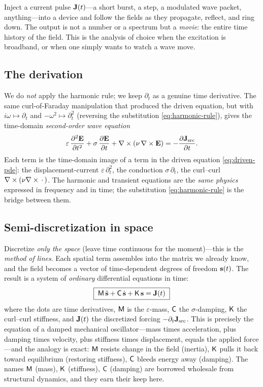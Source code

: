 \begin{physicsbox}
Inject a current pulse $\mathbf{J}(t)$---a short burst, a step, a modulated wave packet,
anything---into a device and follow the fields as they propagate, reflect, and
ring down. The output is not a number or a spectrum but a \emph{movie}: the
entire time history of the field. This is the analysis of choice when the
excitation is broadband, or when one simply wants to watch a wave move.
\end{physicsbox}

\subsection{The derivation}

We do \emph{not} apply the harmonic rule; we keep $\partial_t$ as a genuine time
derivative. The same curl-of-Faraday manipulation that produced the driven
equation, but with $i\omega\mapsto\partial_t$ and $-\omega^2\mapsto\partial_t^2$
(reversing the substitution \cref{eq:harmonic-rule}), gives the time-domain
\emph{second-order wave equation}
\begin{equation}
  \varepsilon\,\frac{\partial^2\mathbf{E}}{\partial t^2}
    + \sigma\,\frac{\partial\mathbf{E}}{\partial t}
    + \nabla\times(\nu\,\nabla\times\mathbf{E})
    = -\frac{\partial\mathbf{J}_{\text{src}}}{\partial t}.
  \label{eq:transient-pde}
\end{equation}
Each term is the time-domain image of a term in the driven equation
\cref{eq:driven-pde}: the displacement-current $\varepsilon\,\partial_t^2$, the
conduction $\sigma\,\partial_t$, the curl--curl $\nabla\times(\nu\nabla\times\,\cdot\,)$. The
harmonic and transient equations are the \emph{same physics} expressed in
frequency and in time; the substitution \cref{eq:harmonic-rule} is the bridge
between them.

\subsection{Semi-discretization in space}

Discretize \emph{only the space} (leave time continuous for the moment)---this is
the \emph{method of lines}. Each spatial term assembles into the matrix we
already know, and the field becomes a vector of time-dependent degrees of freedom
$\mathbf{s}(t)$. The result is a system of \emph{ordinary} differential equations in
time:
\begin{equation}
  \boxed{\;\mathsf{M}\,\ddot{\mathbf{s}} + \mathsf{C}\,\dot{\mathbf{s}} + \mathsf{K}\,\mathbf{s} = \mathbf{J}(t)\;}
  \label{eq:transient-ode}
\end{equation}
where the dots are time derivatives, $\mathsf{M}$ is the $\varepsilon$-mass, $\mathsf{C}$ the
$\sigma$-damping, $\mathsf{K}$ the curl--curl stiffness, and $\mathbf{J}(t)$ the discretized
forcing $-\partial_t\mathbf{J}_{\text{src}}$. This is precisely the equation of a damped
mechanical oscillator---mass times acceleration, plus damping times velocity,
plus stiffness times displacement, equals the applied force---and the analogy is
exact: $\mathsf{M}$ resists change in the field (inertia), $\mathsf{K}$ pulls it back toward
equilibrium (restoring stiffness), $\mathsf{C}$ bleeds energy away (damping). The names
$\mathsf{M}$ (mass), $\mathsf{K}$ (stiffness), $\mathsf{C}$ (damping) are borrowed wholesale from
structural dynamics, and they earn their keep here.

